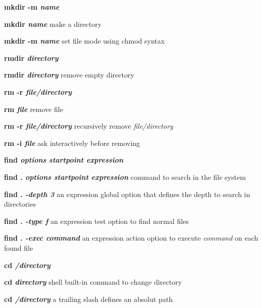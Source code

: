 \documentclass[a4paper,11pt,twoside]{article}
\begin{document}
\vspace{1mm}

\begin{labeling}{\textbf{mkdir -m \textit{name}}}
\item [\textbf{mkdir \textit{name}}] make a directory
\item [\textbf{mkdir -m \textit{name}}] set file mode using chmod syntax
\end{labeling}

\vspace{1mm}

\begin{labeling}{\textbf{rmdir \textit{directory}}}
\item [\textbf{rmdir \textit{directory}}] remove empty directory
\end{labeling}

\vspace{1mm}

\begin{labeling}{\textbf{rm -r \textit{file/directory}}}
\item [\textbf{rm \textit{file}}] remove file
\item [\textbf{rm -r \textit{file/directory}}] recursively remove \textit{file/directory}
\item [\textbf{rm -i \textit{file}}] ask interactively before removing
\end{labeling}

\vspace{1mm}

\begin{labeling}{\textbf{find \textit{options startpoint expression}}}
\item [\textbf{find . \textit{options startpoint expression}}] command to search in the file system
\item[\textbf{find . \textit{-depth 3}}] an expression global option that defines the depth to search in directories
\item [\textbf{find . \textit{-type f}}] an expression test option to find normal files  
\item [\textbf{find . \textit{-exec command}}] an expression action option to execute \textit{command} on each found file
\end{labeling}

\vspace{1mm}

\begin{labeling}{\textbf{cd \textit{/directory}}}
\item [\textbf{cd \textit{directory}}] shell built-in command to change directory
\item [\textbf{cd \textit{/directory}}] a trailing slash defines an absolut path
\end{labeling}
\end{document}

